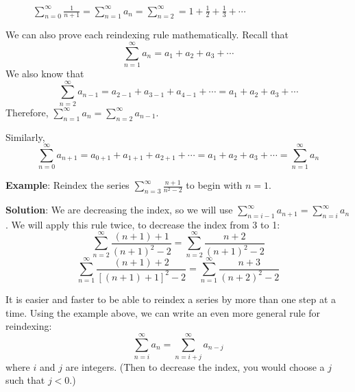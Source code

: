 \begin{figure}[htbp]
\centering
    \caption{$\sum_{n=0}^\infty \frac{1}{n + 1} = \sum_{n=1}^\infty a_n = 
    \sum_{n=2}^\infty = 1 + \frac{1}{2} + \frac{1}{3} + \cdots$}
    \label{fig:reindex}
\end{figure}

We can also prove each reindexing rule mathematically. Recall that 
$$\sum_{n=1}^\infty a_n = a_1 + a_2 + a_3 + \cdots$$
We also know that 
$$\sum_{n=2}^\infty a_{n-1} = a_{2-1} + a_{3-1} + a_{4-1} + \cdots = a_1 + a_2 
+ a_3 + \cdots$$
Therefore, $\sum_{n=1}^\infty a_n = \sum_{n=2}^\infty a_{n-1}$. 

Similarly, 
$$\sum_{n=0}^\infty a_{n + 1} = a_{0+1} + a_{1+1} + a_{2+1} + \cdots = a_1 + 
a_2 + a_3 + \cdots = \sum_{n=1}^\infty a_n$$

\textbf{Example}: Reindex the series $\sum_{n=3}^\infty \frac{n + 1}{n^2 - 2}$ 
to begin with $n=1$.

\textbf{Solution}: We are decreasing the index, so we will use $\sum_{n=i-1}^
\infty a_{n+1} = \sum_{n=i}^\infty a_n$. We will apply this rule twice, to 
decrease the index from 3 to 1:
$$\sum_{n=2}^\infty \frac{(n + 1) + 1}{(n + 1)^2 - 2} = \sum_{n=2}^\infty 
\frac{n + 2}{(n + 1)^2 - 2}$$
$$\sum_{n=1}^\infty \frac{(n + 1) + 2}{\left[ (n + 1) + 1 \right]^2 - 2} = 
\sum_{n=1}^\infty \frac{n + 3}{(n + 2)^2 - 2}$$

It is easier and faster to be able to reindex a series by more than one step 
at a time. Using the example above, we can write an even more general rule for 
reindexing:
$$\sum_{n=i}^\infty a_n = \sum_{n=i + j}^\infty a_{n - j}$$
where $i$ and $j$ are integers. (Then to decrease the index, you would choose 
a $j$ such that $j < 0$.)

